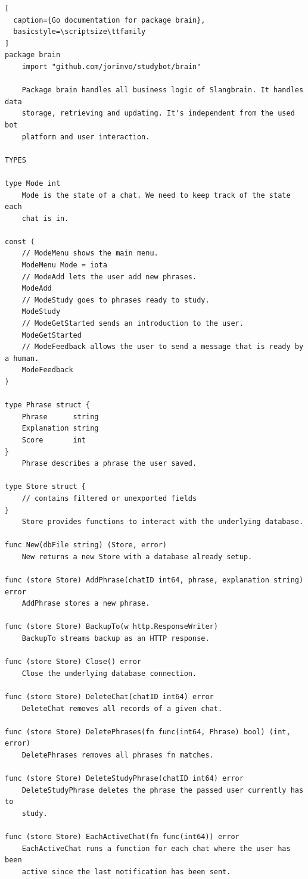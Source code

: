 \pagebreak
\begin{lstlisting}[
  caption={Go documentation for package brain},
  basicstyle=\scriptsize\ttfamily
]
package brain
    import "github.com/jorinvo/studybot/brain"

    Package brain handles all business logic of Slangbrain. It handles data
    storage, retrieving and updating. It's independent from the used bot
    platform and user interaction.

TYPES

type Mode int
    Mode is the state of a chat. We need to keep track of the state each
    chat is in.

const (
    // ModeMenu shows the main menu.
    ModeMenu Mode = iota
    // ModeAdd lets the user add new phrases.
    ModeAdd
    // ModeStudy goes to phrases ready to study.
    ModeStudy
    // ModeGetStarted sends an introduction to the user.
    ModeGetStarted
    // ModeFeedback allows the user to send a message that is ready by a human.
    ModeFeedback
)

type Phrase struct {
    Phrase      string
    Explanation string
    Score       int
}
    Phrase describes a phrase the user saved.

type Store struct {
    // contains filtered or unexported fields
}
    Store provides functions to interact with the underlying database.

func New(dbFile string) (Store, error)
    New returns a new Store with a database already setup.

func (store Store) AddPhrase(chatID int64, phrase, explanation string) error
    AddPhrase stores a new phrase.

func (store Store) BackupTo(w http.ResponseWriter)
    BackupTo streams backup as an HTTP response.

func (store Store) Close() error
    Close the underlying database connection.

func (store Store) DeleteChat(chatID int64) error
    DeleteChat removes all records of a given chat.

func (store Store) DeletePhrases(fn func(int64, Phrase) bool) (int, error)
    DeletePhrases removes all phrases fn matches.

func (store Store) DeleteStudyPhrase(chatID int64) error
    DeleteStudyPhrase deletes the phrase the passed user currently has to
    study.

func (store Store) EachActiveChat(fn func(int64)) error
    EachActiveChat runs a function for each chat where the user has been
    active since the last notification has been sent.


\end{lstlisting}
